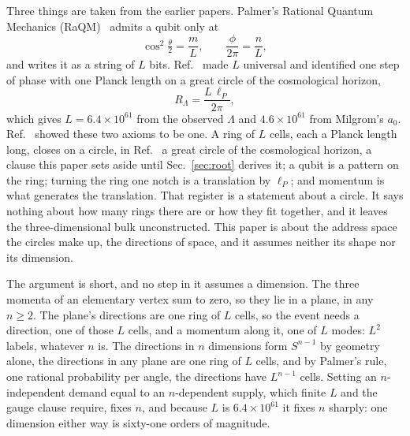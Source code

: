 \documentclass[aps,prd,twocolumn,superscriptaddress,nofootinbib]{revtex4-2}
\begin{document}
Three things are taken from the earlier papers. Palmer's Rational Quantum Mechanics (RaQM)~\cite{palmer2020,palmer2026,palmer2026b,palmer2026c} admits a qubit only at
\begin{equation}
\cos^2\tfrac{\theta}{2} = \frac{m}{L},\qquad \frac{\phi}{2\pi} = \frac{n}{L},
\label{eq:raqm}
\end{equation}
and writes it as a string of $L$ bits. Ref.~\cite{korytko2026} made $L$ universal and identified one step of phase with one Planck length on a great circle of the cosmological horizon,
\begin{equation}
R_\Lambda = \frac{L\,\ell_P}{2\pi},
\label{eq:ident}
\end{equation}
which gives $L = 6.4\times10^{61}$ from the observed $\Lambda$ and $4.6\times10^{61}$ from Milgrom's $a_0$. Ref.~\cite{korytko2026c} showed these two axioms to be one. A ring of $L$ cells, each a Planck length long, closes on a circle, in Ref.~\cite{korytko2026c} a great circle of the cosmological horizon, a clause this paper sets aside until Sec.~\ref{sec:root} derives it; a qubit is a pattern on the ring; turning the ring one notch is a translation by $\ell_P$; and momentum is what generates the translation. That register is a statement about a circle. It says nothing about how many rings there are or how they fit together, and it leaves the three-dimensional bulk unconstructed. This paper is about the address space the circles make up, the directions of space, and it assumes neither its shape nor its dimension.

The argument is short, and no step in it assumes a dimension. The three momenta of an elementary vertex sum to zero, so they lie in a plane, in any $n \ge 2$. The plane's directions are one ring of $L$ cells, so the event needs a direction, one of those $L$ cells, and a momentum along it, one of $L$ modes: $L^2$ labels, whatever $n$ is. The directions in $n$ dimensions form $S^{n-1}$ by geometry alone, the directions in any plane are one ring of $L$ cells, and by Palmer's rule, one rational probability per angle, the directions have $L^{n-1}$ cells. Setting an $n$-independent demand equal to an $n$-dependent supply, which finite $L$ and the gauge clause require, fixes $n$, and because $L$ is $6.4\times10^{61}$ it fixes $n$ sharply: one dimension either way is sixty-one orders of magnitude.
\end{document}
